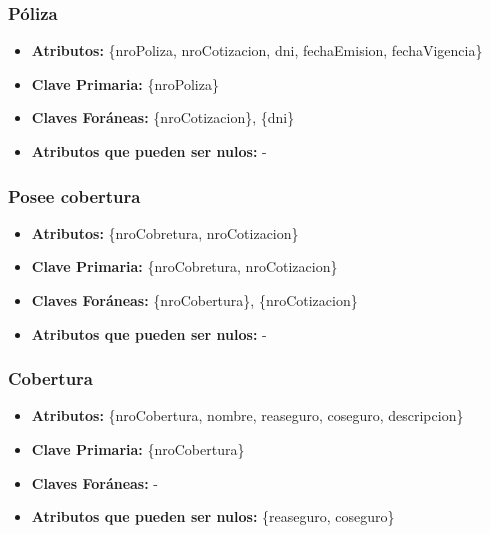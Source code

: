 \documentclass[a4paper,11pt]{article}
\begin{document}
\subsubsection{Póliza}

\begin{itemize}

	\item \textbf{Atributos:} \{nroPoliza, nroCotizacion, dni, fechaEmision, fechaVigencia\}

	\item \textbf{Clave Primaria:} \{nroPoliza\}

	\item \textbf{Claves Foráneas:} \{nroCotizacion\}, \{dni\}

	\item \textbf{Atributos que pueden ser nulos:} -
	
\end{itemize}

\subsubsection{Posee cobertura}

\begin{itemize}

	\item \textbf{Atributos:} \{nroCobretura, nroCotizacion\}

	\item \textbf{Clave Primaria:} \{nroCobretura, nroCotizacion\}
	
	\item \textbf{Claves Foráneas:} \{nroCobertura\}, \{nroCotizacion\}

	\item \textbf{Atributos que pueden ser nulos:} -
	
\end{itemize}

\subsubsection{Cobertura}

\begin{itemize}

	\item \textbf{Atributos:} \{nroCobertura, nombre, reaseguro, coseguro, descripcion\}

	\item \textbf{Clave Primaria:} \{nroCobertura\}
	
	\item \textbf{Claves Foráneas:} -

	\item \textbf{Atributos que pueden ser nulos:} \{reaseguro, coseguro\} 
	
\end{itemize}
\end{document}

